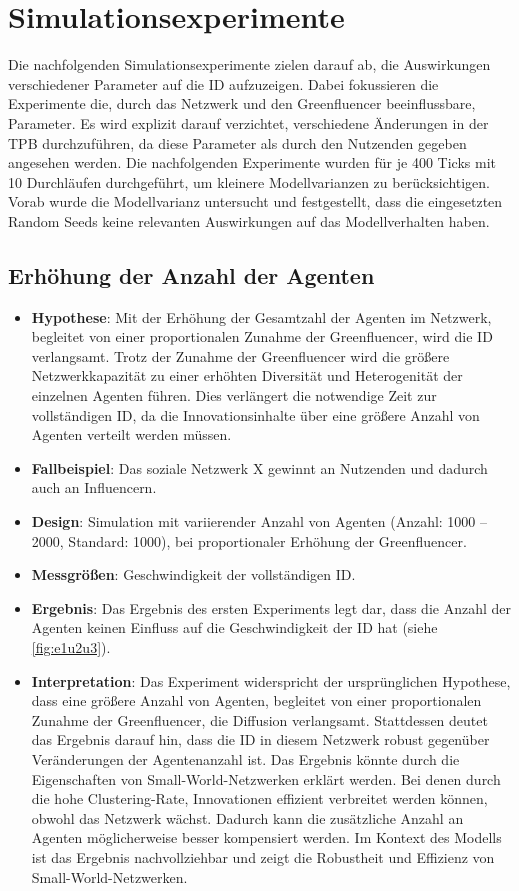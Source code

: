 \documentclass[runningheads]{llncs}
\begin{document}
\section{Simulationsexperimente}\label{Simulationsexperimente}
Die nachfolgenden Simulationsexperimente zielen darauf ab, die Auswirkungen verschiedener Parameter auf die ID aufzuzeigen. Dabei fokussieren die Experimente die, durch das Netzwerk und den Greenfluencer beeinflussbare, Parameter. 
Es wird explizit darauf verzichtet, verschiedene Änderungen in der TPB durchzuführen, da diese Parameter als durch den Nutzenden gegeben angesehen werden. 
Die nachfolgenden Experimente wurden für je 400 Ticks mit 10 Durchläufen durchgeführt, um kleinere Modellvarianzen zu berücksichtigen. 
Vorab wurde die Modellvarianz untersucht und festgestellt, dass die eingesetzten Random Seeds keine relevanten Auswirkungen auf das Modellverhalten haben. 

\subsection{Erhöhung der Anzahl der Agenten}
\begin{itemize}
  \item \textbf{Hypothese}: Mit der Erhöhung der Gesamtzahl der Agenten im Netzwerk, begleitet von einer proportionalen Zunahme der Greenfluencer, wird die ID verlangsamt. Trotz der Zunahme der Greenfluencer wird die größere Netzwerkkapazität zu einer erhöhten Diversität und Heterogenität der einzelnen Agenten führen. Dies verlängert die notwendige Zeit zur vollständigen ID, da die Innovationsinhalte über eine größere Anzahl von Agenten verteilt werden müssen.
  \item \textbf{Fallbeispiel}: Das soziale Netzwerk X gewinnt an Nutzenden und dadurch auch an Influencern.
  \item \textbf{Design}: Simulation mit variierender Anzahl von Agenten (Anzahl: 1000 – 2000, Standard: 1000), bei proportionaler Erhöhung der Greenfluencer.
  \item \textbf{Messgrößen}: Geschwindigkeit der vollständigen ID.
  \item \textbf{Ergebnis}: Das Ergebnis des ersten Experiments legt dar, dass die Anzahl der Agenten keinen Einfluss auf die Geschwindigkeit der ID hat (siehe \ref{fig:e1u2u3}).
  \item \textbf{Interpretation}: Das Experiment widerspricht der ursprünglichen Hypothese, dass eine größere Anzahl von Agenten, begleitet von einer proportionalen Zunahme der Greenfluencer, die Diffusion verlangsamt. Stattdessen deutet das Ergebnis darauf hin, dass die ID in diesem Netzwerk robust gegenüber Veränderungen  der Agentenanzahl ist. Das Ergebnis könnte durch die Eigenschaften von Small-World-Netzwerken erklärt werden. Bei denen durch die hohe Clustering-Rate, Innovationen effizient verbreitet werden können, obwohl das Netzwerk wächst. Dadurch kann die zusätzliche Anzahl an Agenten möglicherweise besser kompensiert werden. Im Kontext des Modells ist das Ergebnis nachvollziehbar und zeigt die Robustheit und Effizienz von Small-World-Netzwerken.
\end{itemize}
\end{document}
